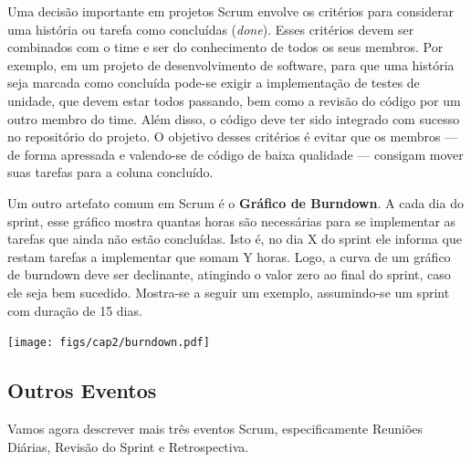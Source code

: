 \documentclass[
  11pt,
  twoside]{book}
\let\origfigure\figure
\let\endorigfigure\endfigure
\renewenvironment{figure}[1][2] {
    \expandafter\origfigure\expandafter[!h]
} {
    \endorigfigure
}
\begin{document}

Uma decisão importante em projetos Scrum envolve os critérios para
considerar uma história ou tarefa como concluídas (\emph{done}). Esses
critérios devem ser combinados com o time e ser do conhecimento de todos
os seus membros. Por exemplo, em um projeto de desenvolvimento de
software, para que uma história seja marcada como concluída pode-se
exigir a implementação de testes de unidade, que devem estar todos
passando, bem como a revisão do código por um outro membro do time. Além
disso, o código deve ter sido integrado com sucesso no repositório do
projeto. O objetivo desses critérios é evitar que os membros --- de
forma apressada e valendo-se de código de baixa qualidade --- consigam
mover suas tarefas para a coluna concluído.

 

Um outro artefato comum em Scrum é o \textbf{Gráfico de Burndown}. A
cada dia do sprint, esse gráfico mostra quantas horas são necessárias
para se implementar as tarefas que ainda não estão concluídas. Isto é,
no dia X do sprint ele informa que restam tarefas a implementar que
somam Y horas. Logo, a curva de um gráfico de burndown deve ser
declinante, atingindo o valor zero ao final do sprint, caso ele seja bem
sucedido. Mostra-se a seguir um exemplo, assumindo-se um sprint com
duração de 15 dias.

\begin{figure}
\centering
\texttt{[image: figs/cap2/burndown.pdf]}
\caption{Gráfico de Burndown, assumindo um sprint de 15 dias.}
\end{figure}

\hypertarget{outros-eventos}{%
\subsection{Outros Eventos}\label{outros-eventos}}

Vamos agora descrever mais três eventos Scrum, especificamente Reuniões
Diárias, Revisão do Sprint e Retrospectiva.

  
\end{document}
